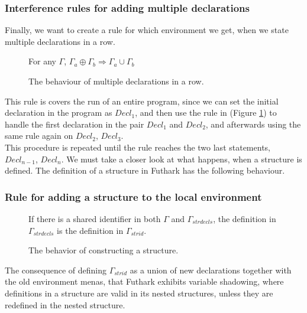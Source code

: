 \subsubsection{Interference rules for adding multiple declarations}
Finally, we want to create a rule for which environment we get, when we state
multiple declarations in a row.
\begin{figure}
  \begin{tcolorbox}
    \begin{prooftree}
      \end{prooftree}
      For any $\Gamma$, $\Gamma_a \oplus \Gamma_b \Rightarrow \Gamma_a \cup \Gamma_b$
    \end{tcolorbox}
  \caption{The behaviour of multiple declarations in a row. \label{RuleAddMultiple}}
\end{figure}
This rule is covers the run of an entire program, since we can set the initial
declaration in the program as $Decl_1$, and then use the rule in (Figure \ref{RuleAddMultiple}) to handle
the first declaration in the pair $Decl_1$ and $Decl_2$, and afterwards using
the same rule again on $Decl_2$, $Decl_3$.
\\
This procedure is repeated until the rule reaches the two last statements,
$Decl_{n-1}$, $Decl_n$. 
We must take a closer look at what happens, when a structure is defined.
The definition of a structure in Futhark has the following behaviour.
\subsubsection{Rule for adding a structure to the local environment}
\begin{figure}
  \begin{tcolorbox}
    \begin{prooftree}
    \end{prooftree}
    If there is a shared identifier in both $\Gamma$ and $\Gamma_{strdecls}$,
    the definition in $\Gamma_{strdecls}$ is the definition in $\Gamma_{strid}$.
  \end{tcolorbox}
  \caption{The behavior of constructing a structure.\label{RuleAddStruct}}
\end{figure}
The consequence of defining $\Gamma_{strid}$ as a union of new declarations together with the old environment menas, that Futhark exhibits variable shadowing, where definitions in a structure are valid in its nested structures, unless they are redefined in the nested structure.
\clearpage
